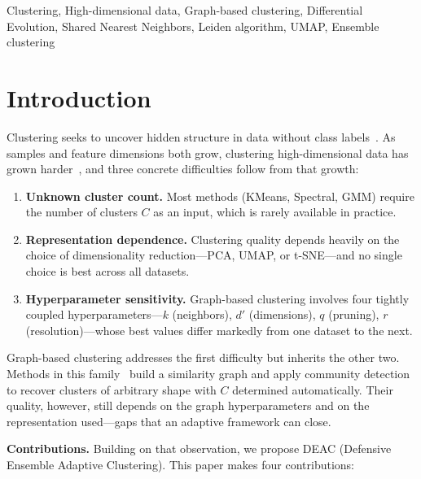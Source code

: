 \documentclass[journal]{IEEEtran}
\begin{document}
\begin{IEEEkeywords}
Clustering, High-dimensional data, Graph-based clustering, Differential Evolution, Shared Nearest Neighbors, Leiden algorithm, UMAP, Ensemble clustering
\end{IEEEkeywords}

\section{Introduction}

Clustering seeks to uncover hidden structure in data without class labels~\cite{jain2010data}. As samples and feature dimensions both grow, clustering high-dimensional data has grown harder~\cite{steinbach2004challenges}, and three concrete difficulties follow from that growth:

\begin{enumerate}
\item \textbf{Unknown cluster count.} Most methods (KMeans, Spectral, GMM) require the number of clusters $C$ as an input, which is rarely available in practice.
\item \textbf{Representation dependence.} Clustering quality depends heavily on the choice of dimensionality reduction---PCA, UMAP, or t-SNE---and no single choice is best across all datasets.
\item \textbf{Hyperparameter sensitivity.} Graph-based clustering involves four tightly coupled hyperparameters---$k$ (neighbors), $d'$ (dimensions), $q$ (pruning), $r$ (resolution)---whose best values differ markedly from one dataset to the next.
\end{enumerate}

Graph-based clustering addresses the first difficulty but inherits the other two. Methods in this family~\cite{schaeffer2007graph} build a similarity graph and apply community detection~\cite{blondel2008fast,traag2019louvain} to recover clusters of arbitrary shape with $C$ determined automatically. Their quality, however, still depends on the graph hyperparameters and on the representation used---gaps that an adaptive framework can close.

\textbf{Contributions.} Building on that observation, we propose DEAC (Defensive Ensemble Adaptive Clustering). This paper makes four contributions:
\end{document}
